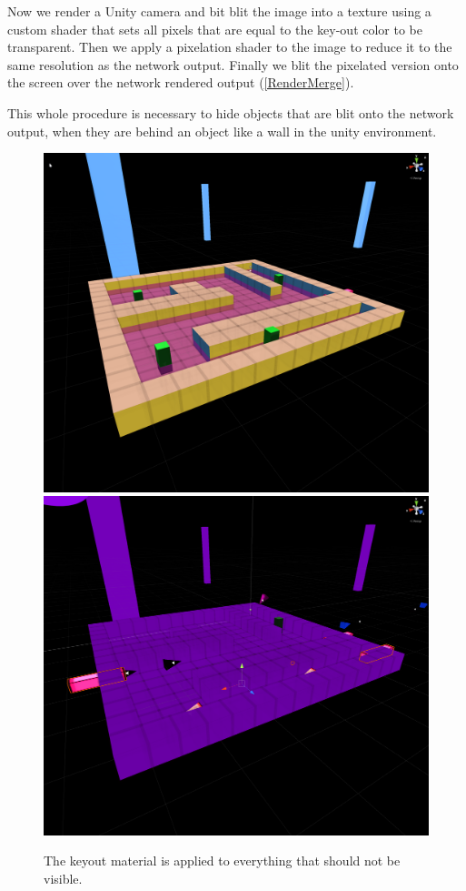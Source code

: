 Now we render a Unity camera and bit blit the image into a texture using a custom shader that sets all pixels that are equal to the key-out color to be transparent. Then we apply a pixelation shader to the image to reduce it to the same resolution as the network output. Finally we blit the pixelated version onto the screen over the network rendered output (\cref{RenderMerge}).

This whole procedure is necessary to hide objects that are blit onto the network output, when they are behind an object like a wall in the unity environment.

\begin{figure}[p]
  \centering
  \includegraphics[width=\imgWidth]{images/neural_network_systems/NoKeyout.png} \\[\picVdist]
  \includegraphics[width=\imgWidth]{images/neural_network_systems/WithKeyout.png}
  \caption{The keyout material is applied to everything that should not be visible.}
  \label{KeyoutEditor}
\end{figure}

